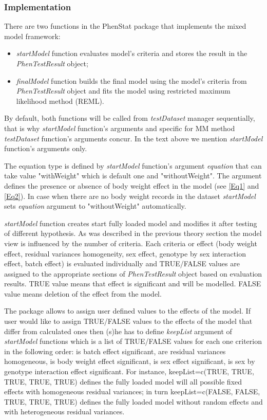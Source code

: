 \documentclass[12pt,a4paper]{article}
\begin{document}
\subsubsection{Implementation}
\label{sec:MMImplementation}
There are two functions in the PhenStat package that implements the mixed model framework:
\begin{itemize}
\item \textit{startModel} function evaluates model's criteria and stores the result in the \textit{PhenTestResult} object;
\item \textit{finalModel} function builds the final model using the model's criteria from \textit{PhenTestResult} object and fits the model using restricted maximum likelihood method (REML). 
\end{itemize}

By default, both functions will be called from \textit{testDataset} manager sequentially, that is why \textit{startModel} function's arguments and specific for MM method \textit{testDataset} function's arguments concur.
In the text above we mention \textit{startModel} function's arguments only. 

The equation type is defined by \textit{startModel} function's argument \textit{equation} that can take value "withWeight" which is default one and "withoutWeight". The argument defines the presence or absence of body weight effect in the model (see \ref{Eq1} and \ref{Eq2}). 
In case when there are no body weight records in the dataset \textit{startModel} sets \textit{equation} argument to "withoutWeight" automatically.

\textit{startModel} function creates start fully loaded model and modifies it after testing of different hypothesis. 
As was described in the previous theory section the model view is influenced by the number of criteria. 
Each criteria or effect (body weight effect, residual variances homogeneity, sex effect, genotype by sex interaction effect, batch effect) is evaluated individually
and TRUE/FALSE values are assigned to the appropriate sections of \textit{PhenTestResult} object based on evaluation results. 
TRUE value means that effect is significant and will be modelled. FALSE value means deletion of the effect from the model.

The package allows to assign user defined values to the effects of the model. 
If user would like to assign TRUE/FALSE values to the effects of the model that differ from calculated ones then (s)he has to define \textit{keepList} argument of \textit{startModel} functions 
which is a list of TRUE/FALSE values for each one criterion in the following order: is batch effect significant, are residual variances homogeneous, is body weight effect significant, 
is sex effect significant, is sex by genotype interaction effect significant. 
For instance, keepList=c(TRUE, TRUE, TRUE, TRUE, TRUE) defines the fully loaded model will all possible fixed effects with homogeneous residual variances; 
in turn keepList=c(FALSE, FALSE, TRUE, TRUE, TRUE) defines the fully loaded model without random effects and with heterogeneous residual variances.
\end{document}
